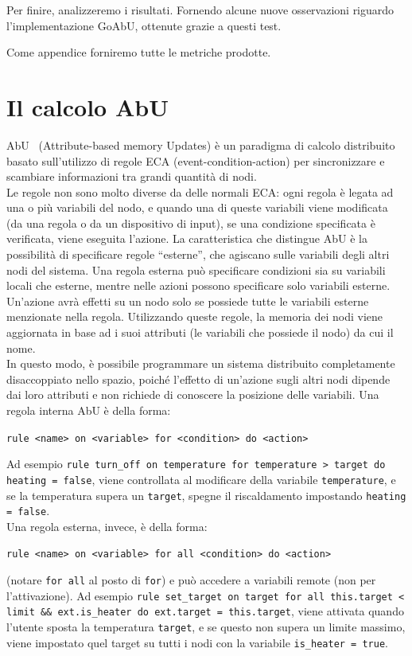 \documentclass[12pt, a4paper]{article}
\begin{document}
Per finire, analizzeremo i risultati. Fornendo alcune nuove osservazioni riguardo l'implementazione GoAbU, ottenute grazie a questi test.

Come appendice forniremo tutte le metriche prodotte.

\section{Il calcolo AbU}

AbU~\cite{MP-ICTAC-2021} (Attribute-based memory Updates) è un paradigma di calcolo distribuito basato sull'utilizzo di regole ECA (event-condition-action) per sincronizzare e scambiare informazioni tra grandi quantità di nodi.\\
Le regole non sono molto diverse da delle normali ECA: ogni regola è legata ad una o più variabili del nodo, e quando una di queste variabili viene modificata (da una regola o da un dispositivo di input), se una condizione specificata è verificata, viene eseguita l'azione.
La caratteristica che distingue AbU è la possibilità di specificare regole ``esterne'', che agiscano sulle variabili degli altri nodi del sistema. Una regola esterna può specificare condizioni sia su variabili locali che esterne, mentre nelle azioni possono specificare solo variabili esterne. Un'azione avrà effetti su un nodo solo se possiede tutte le variabili esterne menzionate nella regola.
Utilizzando queste regole, la memoria dei nodi viene aggiornata in base ad i suoi attributi (le variabili che possiede il nodo) da cui il nome.\\
In questo modo, è possibile programmare un sistema distribuito completamente disaccoppiato nello spazio, poiché l'effetto di un'azione sugli altri nodi dipende dai loro attributi e non richiede di conoscere la posizione delle variabili.
Una regola interna AbU è della forma:
\begin{center}
    \lstinline{rule <name> on <variable> for <condition> do <action>}
\end{center}
Ad esempio \lstinline{rule turn_off on temperature for temperature > target do heating = false}, viene controllata al modificare della variabile \lstinline{temperature}, e se la temperatura supera un \lstinline{target}, spegne il riscaldamento impostando \lstinline{heating = false}.\\
Una regola esterna, invece, è della forma:
\begin{center}
    \lstinline{rule <name> on <variable> for all <condition> do <action>}
\end{center}
(notare \lstinline{for all} al posto di \lstinline{for}) e può accedere a variabili remote (non per l'attivazione). Ad esempio \lstinline{rule set_target on target for all this.target < limit && ext.is_heater do ext.target = this.target}, viene attivata quando l'utente sposta la temperatura \lstinline{target}, e se questo non supera un limite massimo, viene impostato quel target su tutti i nodi con la variabile \lstinline{is_heater = true}.
\end{document}
